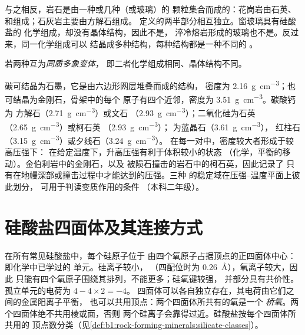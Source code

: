 与之相反，岩石是由一种或几种（或玻璃）的
颗粒集合而成的：花岗岩由石英、和组成；石灰岩主要由方解石组成。
定义的两半部分相互独立。窗玻璃具有硅酸盐的
化学组成，却没有晶体结构，因此不是，
淬冷熔岩形成的玻璃也不是。反过来，同一化学组成可以
结晶成多种结构，每种结构都是一种不同的
。

\begin{definition}[同质多象变体]\label{def:b1:rock-forming-minerals:polymorph}
若两种互为\emph{同质多象变体}，
即二者化学组成相同、晶体结构不同。
\end{definition}

碳可结晶为石墨，它是由六边形网层堆叠而成的结构，
密度为 \qty{2.16}{g.cm^{-3}}；也可结晶为金刚石，骨架中的每个
原子有四个近邻，密度为 \qty{3.51}{g.cm^{-3}}。碳酸钙为
方解石（\qty{2.71}{g.cm^{-3}}）或文石
（\qty{2.93}{g.cm^{-3}}）；二氧化硅为石英（\qty{2.65}{g.cm^{-3}}）或柯石英
（\qty{2.93}{g.cm^{-3}}）； 为蓝晶石（\qty{3.61}{g.cm^{-3}}），
红柱石（\qty{3.15}{g.cm^{-3}}）或夕线石（\qty{3.24}{g.cm^{-3}}）。
在每一对中，密度较大者形成于较高压强下：
在给定温度下，升高压强有利于体积较小的状态
（化学，平衡的移动）。金伯利岩中的金刚石，以及
被陨石撞击的岩石中的柯石英，因此记录了
只有在地幔深部或撞击过程中才能达到的压强。三种
 的稳定域在压强–温度平面上彼此划分，
可用于判读变质作用的条件
（本科二年级）。

\section{硅酸盐四面体及其连接方式}

在所有常见硅酸盐中，每个硅原子位于
由四个氧原子占据顶点的正四面体中心：
即化学中已学过的  单元。硅离子较小，
（四配位时为 \qty{0.26}{\angstrom}），氧离子较大，因此
只能有四个氧原子围绕其排列，不能更多；硅氧键较强，
并部分具有共价性。孤立单元的电荷为 $4 - 4\times2 = -4$。
四面体可以各自独立存在，其电荷由它们之间的金属阳离子平衡，
也可以共用顶点：两个四面体所共有的氧是一个
\emph{桥氧}。两个四面体绝不共用棱或面，否则
两个硅离子会靠得过近。硅酸盐按每个四面体所共用的
顶点数分类（见\cref{def:b1:rock-forming-minerals:silicate-classes}）。

